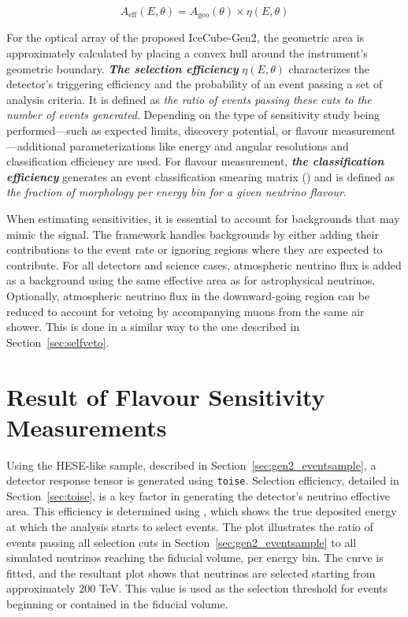 \begin{equation}
    A_{\text{eff}}(E, \theta) = A_{\text{geo}}(\theta) \times \eta(E, \theta)
\end{equation}

For the optical array of the proposed IceCube-Gen2, the geometric area is approximately calculated by placing a convex hull around the instrument's geometric boundary. \textbf{\emph{The selection efficiency}} \( \eta(E, \theta) \) characterizes the detector's triggering efficiency and the probability of an event passing a set of analysis criteria. It is defined as \emph{the ratio of events passing these cuts to the number of events generated}. Depending on the type of sensitivity study being performed—such as expected limits, discovery potential, or flavour measurement—additional parameterizations like energy and angular resolutions and classification efficiency are used. For flavour measurement, \textbf{\emph{the classification efficiency}} generates an event classification smearing matrix () and is defined as \emph{the fraction of morphology per energy bin for a given neutrino flavour}.

When estimating sensitivities, it is essential to account for backgrounds that may mimic the signal. The framework handles backgrounds by either adding their contributions to the event rate or ignoring regions where they are expected to contribute. For all detectors and science cases, atmospheric neutrino flux is added as a background using the same effective area as for astrophysical neutrinos. Optionally, atmospheric neutrino flux in the downward-going region can be reduced to account for vetoing by accompanying muons from the same air shower. This is done in a similar way to the one described in Section~\ref{sec:selfveto}.

\section{Result of Flavour Sensitivity Measurements}
\label{sec:gen2-results}
Using the HESE-like sample, described in Section~\ref{sec:gen2_eventsample}, a detector response tensor is generated using \texttt{toise}. Selection efficiency, detailed in Section~\ref{sec:toise}, is a key factor in generating the detector's neutrino effective area. This efficiency is determined using , which shows the true deposited energy at which the analysis starts to select events. The plot illustrates the ratio of events passing all selection cuts in Section~\ref{sec:gen2_eventsample} to all simulated neutrinos reaching the fiducial volume, per energy bin. The curve is fitted, and the resultant plot shows that neutrinos are selected starting from approximately 200 TeV. This value is used as the selection threshold for events beginning or contained in the fiducial volume.

